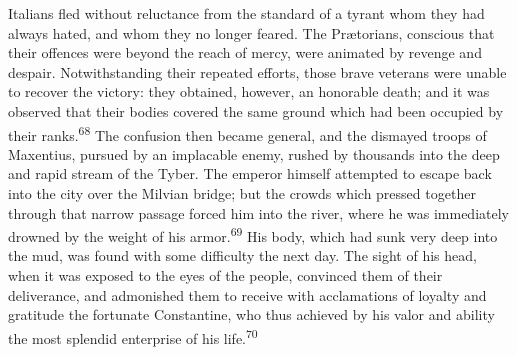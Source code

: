 Italians fled without reluctance from the standard of a tyrant
whom they had always hated, and whom they no longer feared. The
Prætorians, conscious that their offences were beyond the reach
of mercy, were animated by revenge and despair. Notwithstanding
their repeated efforts, those brave veterans were unable to
recover the victory: they obtained, however, an honorable death;
and it was observed that their bodies covered the same ground
which had been occupied by their ranks.\textsuperscript{68} The confusion then
became general, and the dismayed troops of Maxentius, pursued by
an implacable enemy, rushed by thousands into the deep and rapid
stream of the Tyber. The emperor himself attempted to escape back
into the city over the Milvian bridge; but the crowds which
pressed together through that narrow passage forced him into the
river, where he was immediately drowned by the weight of his
armor.\textsuperscript{69} His body, which had sunk very deep into the mud, was
found with some difficulty the next day. The sight of his head,
when it was exposed to the eyes of the people, convinced them of
their deliverance, and admonished them to receive with
acclamations of loyalty and gratitude the fortunate Constantine,
who thus achieved by his valor and ability the most splendid
enterprise of his life.\textsuperscript{70}





